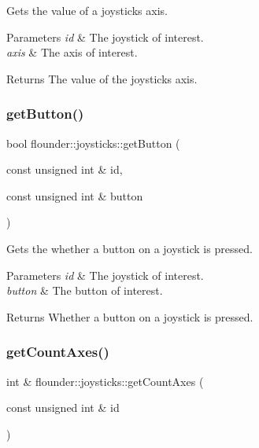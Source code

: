 Gets the value of a joysticks axis. 


\begin{DoxyParams}{Parameters}
{\em id} & The joystick of interest. \\
\hline
{\em axis} & The axis of interest. \\
\hline
\end{DoxyParams}
\begin{DoxyReturn}{Returns}
The value of the joystick\textquotesingle{}s axis. 
\end{DoxyReturn}
\mbox{\label{classflounder_1_1joysticks_a297e86b7a762f260732f45aa4ae18c9e}} 
\subsubsection{\texorpdfstring{get\+Button()}{getButton()}}
{\footnotesize\ttfamily bool flounder\+::joysticks\+::get\+Button (\begin{DoxyParamCaption}\item[{const unsigned int \&}]{id,  }\item[{const unsigned int \&}]{button }\end{DoxyParamCaption})}



Gets the whether a button on a joystick is pressed. 


\begin{DoxyParams}{Parameters}
{\em id} & The joystick of interest. \\
\hline
{\em button} & The button of interest. \\
\hline
\end{DoxyParams}
\begin{DoxyReturn}{Returns}
Whether a button on a joystick is pressed. 
\end{DoxyReturn}
\mbox{\label{classflounder_1_1joysticks_ac8353f4ea09b68f6d363dc1388bfa691}} 
\subsubsection{\texorpdfstring{get\+Count\+Axes()}{getCountAxes()}}
{\footnotesize\ttfamily int \& flounder\+::joysticks\+::get\+Count\+Axes (\begin{DoxyParamCaption}\item[{const unsigned int \&}]{id }\end{DoxyParamCaption})}



